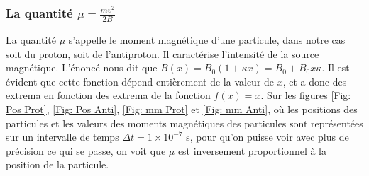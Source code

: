 \documentclass[a4paper,12pt,twoside]{article}
\begin{document}
\subsubsection{La quantit\'e $\mu = \frac{mv^2}{2B}$}
\noindent La quantit\'e $\mu$ s'appelle le moment magn\'etique d'une particule, dans notre cas soit du proton, soit de l'antiproton. Il caract\'erise l'intensit\'e de la source magn\'etique. L'\'enonc\'e \cite{Notes} nous dit que $B(x) = B_0(1 + \kappa x) = B_0 + B_0x\kappa$. Il est \'evident que cette fonction d\'epend enti\`erement de la valeur de $x$, et a donc des extrema en fonction des extrema de la fonction $f(x) = x$. Sur les figures \ref{Fig: Pos Prot}, \ref{Fig: Pos Anti}, \ref{Fig: mm Prot} et \ref{Fig: mm Anti}, o\`u les positions des particules et les valeurs des moments magn\'etiques des particules sont repr\'esent\'ees sur un intervalle de temps $\Delta t = 1\times 10^{-7}$ s, pour qu'on puisse voir avec plus de pr\'ecision ce qui se passe, on voit que $\mu$ est inversement proportionnel \`a la position de la particule.
\end{document}
